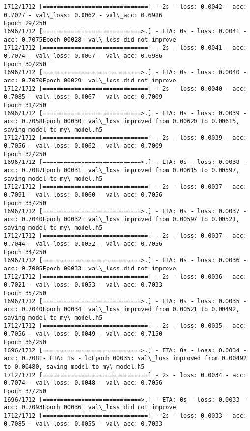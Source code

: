 \documentclass[11pt]{article}
\begin{document}
\begin{Verbatim}[commandchars=\\\{\}]
1712/1712 [==============================] - 2s - loss: 0.0042 - acc: 0.7027 - val\_loss: 0.0062 - val\_acc: 0.6986
Epoch 29/250
1696/1712 [============================>.] - ETA: 0s - loss: 0.0041 - acc: 0.7075Epoch 00028: val\_loss did not improve
1712/1712 [==============================] - 2s - loss: 0.0041 - acc: 0.7074 - val\_loss: 0.0067 - val\_acc: 0.6986
Epoch 30/250
1696/1712 [============================>.] - ETA: 0s - loss: 0.0040 - acc: 0.7070Epoch 00029: val\_loss did not improve
1712/1712 [==============================] - 2s - loss: 0.0040 - acc: 0.7085 - val\_loss: 0.0067 - val\_acc: 0.7009
Epoch 31/250
1696/1712 [============================>.] - ETA: 0s - loss: 0.0039 - acc: 0.7058Epoch 00030: val\_loss improved from 0.00620 to 0.00615, saving model to my\_model.h5
1712/1712 [==============================] - 2s - loss: 0.0039 - acc: 0.7056 - val\_loss: 0.0062 - val\_acc: 0.7009
Epoch 32/250
1696/1712 [============================>.] - ETA: 0s - loss: 0.0038 - acc: 0.7087Epoch 00031: val\_loss improved from 0.00615 to 0.00597, saving model to my\_model.h5
1712/1712 [==============================] - 2s - loss: 0.0037 - acc: 0.7091 - val\_loss: 0.0060 - val\_acc: 0.7056
Epoch 33/250
1696/1712 [============================>.] - ETA: 0s - loss: 0.0037 - acc: 0.7040Epoch 00032: val\_loss improved from 0.00597 to 0.00521, saving model to my\_model.h5
1712/1712 [==============================] - 2s - loss: 0.0037 - acc: 0.7044 - val\_loss: 0.0052 - val\_acc: 0.7056
Epoch 34/250
1696/1712 [============================>.] - ETA: 0s - loss: 0.0036 - acc: 0.7005Epoch 00033: val\_loss did not improve
1712/1712 [==============================] - 2s - loss: 0.0036 - acc: 0.7021 - val\_loss: 0.0053 - val\_acc: 0.7033
Epoch 35/250
1696/1712 [============================>.] - ETA: 0s - loss: 0.0035 - acc: 0.7040Epoch 00034: val\_loss improved from 0.00521 to 0.00492, saving model to my\_model.h5
1712/1712 [==============================] - 2s - loss: 0.0035 - acc: 0.7056 - val\_loss: 0.0049 - val\_acc: 0.7150
Epoch 36/250
1696/1712 [============================>.] - ETA: 0s - loss: 0.0034 - acc: 0.7081- ETA: 1s - loEpoch 00035: val\_loss improved from 0.00492 to 0.00480, saving model to my\_model.h5
1712/1712 [==============================] - 2s - loss: 0.0034 - acc: 0.7074 - val\_loss: 0.0048 - val\_acc: 0.7056
Epoch 37/250
1696/1712 [============================>.] - ETA: 0s - loss: 0.0033 - acc: 0.7093Epoch 00036: val\_loss did not improve
1712/1712 [==============================] - 2s - loss: 0.0033 - acc: 0.7085 - val\_loss: 0.0055 - val\_acc: 0.7033

\end{Verbatim}
\end{document}
